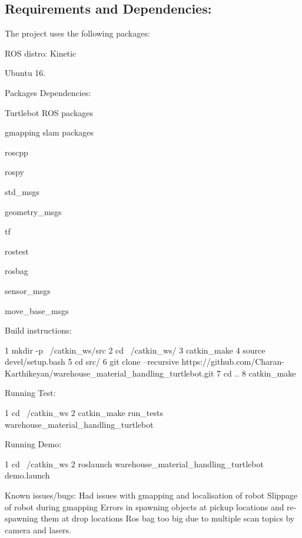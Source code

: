 \subsection*{Requirements and Dependencies\+:}

The project uses the following packages\+:
\begin{DoxyEnumerate}
\item R\+OS distro\+: Kinetic
\item Ubuntu 16.
\item Packages Dependencies\+:
\begin{DoxyItemize}
\item Turtlebot R\+OS packages
\item gmapping slam packages
\item roscpp
\item rospy
\item std\+\_\+msgs
\item geometry\+\_\+msgs
\item tf
\item rostest
\item rosbag
\item sensor\+\_\+msgs
\item move\+\_\+base\+\_\+msgs
\end{DoxyItemize}
\end{DoxyEnumerate}

Build instructions\+: 
\begin{DoxyCode}
1 mkdir -p ~/catkin\_ws/src
2 cd ~/catkin\_ws/
3 catkin\_make
4 source devel/setup.bash
5 cd src/
6 git clone --recursive https://github.com/Charan-Karthikeyan/warehouse\_material\_handling\_turtlebot.git
7 cd ..
8 catkin\_make
\end{DoxyCode}


Running Test\+: 
\begin{DoxyCode}
1 cd ~/catkin\_ws
2 catkin\_make run\_tests warehouse\_material\_handling\_turtlebot
\end{DoxyCode}


Running Demo\+: 
\begin{DoxyCode}
1 cd ~/catkin\_ws
2 roslaunch warehouse\_material\_handling\_turtlebot demo.launch
\end{DoxyCode}


Known issues/bugs\+: Had issues with gmapping and localisation of robot Slippage of robot during gmapping Errors in spawning objects at pickup locations and re-\/spawning them at drop locations Ros bag too big due to multiple scan topics by camera and lasers.

